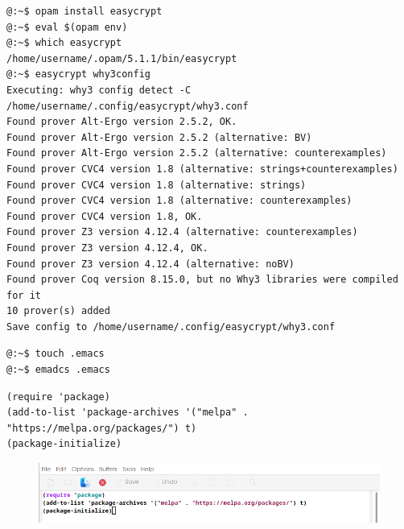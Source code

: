 \begin{lstlisting}[style=normal]
@:~$ opam install easycrypt
@:~$ eval $(opam env)
@:~$ which easycrypt
/home/username/.opam/5.1.1/bin/easycrypt
@:~$ easycrypt why3config
Executing: why3 config detect -C /home/username/.config/easycrypt/why3.conf
Found prover Alt-Ergo version 2.5.2, OK.
Found prover Alt-Ergo version 2.5.2 (alternative: BV)
Found prover Alt-Ergo version 2.5.2 (alternative: counterexamples)
Found prover CVC4 version 1.8 (alternative: strings+counterexamples)
Found prover CVC4 version 1.8 (alternative: strings)
Found prover CVC4 version 1.8 (alternative: counterexamples)
Found prover CVC4 version 1.8, OK.
Found prover Z3 version 4.12.4 (alternative: counterexamples)
Found prover Z3 version 4.12.4, OK.
Found prover Z3 version 4.12.4 (alternative: noBV)
Found prover Coq version 8.15.0, but no Why3 libraries were compiled for it
10 prover(s) added
Save config to /home/username/.config/easycrypt/why3.conf
\end{lstlisting}


\begin{lstlisting}[style=normal]
@:~$ touch .emacs
@:~$ emadcs .emacs
\end{lstlisting}
\begin{lstlisting}[style=normal]
(require 'package)
(add-to-list 'package-archives '("melpa" . "https://melpa.org/packages/") t)
(package-initialize)
\end{lstlisting}
\begin{figure}[h!]\centering
\includegraphics[width=\textwidth]{images/emacs/emacs1}
\end{figure}

%		
%		
%		
